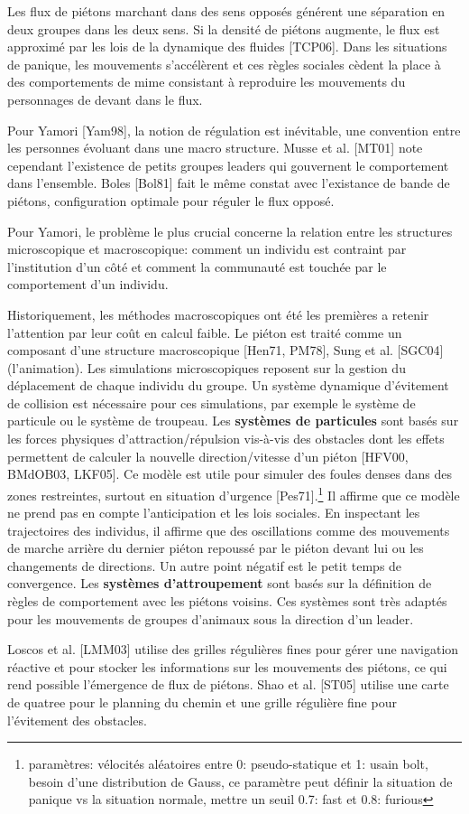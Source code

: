 \documentclass[11pt]{article}
\begin{document}
Les flux de piétons marchant dans des sens opposés générent une séparation en deux groupes dans les deux sens. Si la densité de piétons augmente, le flux est approximé par les lois de la dynamique des fluides [TCP06]. Dans les situations de panique, les mouvements s'accélèrent et ces règles sociales cèdent la place à des comportements de mime consistant à reproduire les mouvements du personnages de devant dans le flux.

Pour Yamori [Yam98], la notion de régulation est inévitable, une convention entre les personnes évoluant dans une macro structure. Musse et al. [MT01] note cependant l'existence de petits groupes leaders qui gouvernent le comportement dans l'ensemble. Boles [Bol81] fait le même constat avec l'existance de bande de piétons, configuration optimale pour réguler le flux opposé.

Pour Yamori, le problème le plus crucial concerne la relation entre les structures microscopique et macroscopique: comment un individu est contraint par l'institution d'un côté et comment la communauté est touchée par le comportement d'un individu. 

Historiquement, les méthodes macroscopiques ont été les premières a retenir l'attention par leur coût en calcul faible. Le piéton est traité comme un composant d'une structure macroscopique [Hen71, PM78], Sung et al. [SGC04] (l'animation).
Les simulations microscopiques reposent sur la gestion du déplacement de chaque individu du groupe. Un système dynamique d'évitement de collision est nécessaire pour ces simulations, par exemple le système de particule ou le système de troupeau. Les \textbf{systèmes de particules} sont basés sur les forces physiques d'attraction/répulsion vis-à-vis des obstacles dont les effets permettent de calculer la nouvelle direction/vitesse d'un piéton [HFV00, BMdOB03, LKF05]. Ce modèle est utile pour simuler des foules denses dans des zones restreintes, surtout en situation d'urgence [Pes71].\footnote{paramètres: vélocités aléatoires entre 0: pseudo-statique et 1: usain bolt, besoin d'une distribution de Gauss, ce paramètre peut définir la situation de panique vs la situation normale, mettre un seuil 0.7: fast et 0.8: furious}
Il affirme que ce modèle ne prend pas en compte l'anticipation et les lois sociales. En inspectant les trajectoires des individus, il affirme que des oscillations comme des mouvements de marche arrière du dernier piéton repoussé par le piéton devant lui ou les changements de directions. Un autre point négatif est le petit temps de convergence.
Les \textbf{systèmes d'attroupement} sont basés sur la définition de règles de comportement avec les piétons voisins. Ces systèmes sont très adaptés pour les mouvements de groupes d'animaux sous la direction d'un leader.

Loscos et al. [LMM03] utilise des grilles régulières fines pour gérer une navigation réactive et pour stocker les informations sur les mouvements des piétons, ce qui rend possible l'émergence de flux de piétons. Shao et al. [ST05] utilise une carte de quatree pour le planning du chemin et une grille régulière fine pour l'évitement des obstacles.
\end{document}
